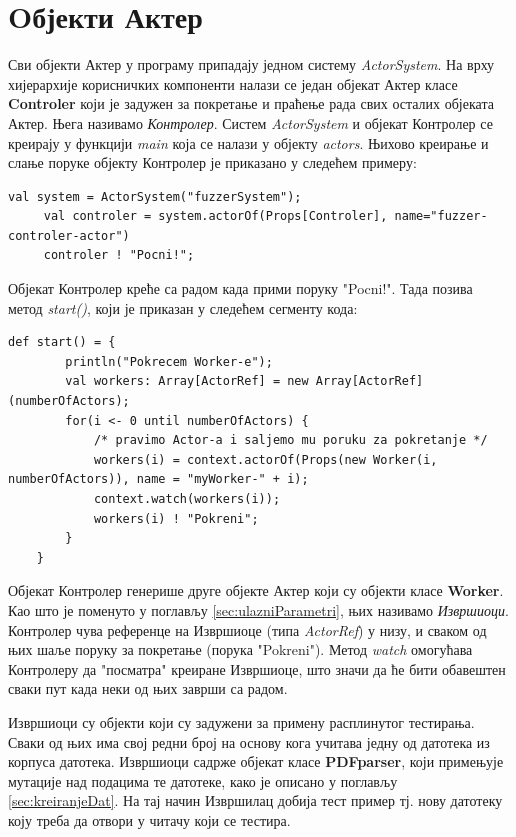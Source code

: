\documentclass[12pt,oneside]{memoir}
\begin{document}
\section{Oбјекти Актер}
\label{sec:actorObj}

Сви објекти Актер у програму припадају једном систему \textit{ActorSystem}. На врху хијерархије корисничких компоненти налази се један објекат Актер класе \textbf{Controler} који је задужен за покретање и праћење рада свих осталих објеката Актер. Њега називамо \textit{Контролер}. Систем \textit{ActorSystem} и објекат Контролер се креирају у функцији \textit{main} која се налази у објекту \textit{actors}. Њихово креирање и слање поруке објекту Контролер је приказано у следећем примеру:

\begin{lstlisting}[frame=single]
     val system = ActorSystem("fuzzerSystem");
     val controler = system.actorOf(Props[Controler], name="fuzzer-controler-actor")
     controler ! "Pocni!";
\end{lstlisting}

Објекат Контролер креће са радом када прими поруку "Pocni!". Тада позива метод \textit{start()}, који је приказан у следећем сегменту кода:

\begin{lstlisting}[frame=single]
    def start() = {
        println("Pokrecem Worker-e");
        val workers: Array[ActorRef] = new Array[ActorRef](numberOfActors);
        for(i <- 0 until numberOfActors) {
            /* pravimo Actor-a i saljemo mu poruku za pokretanje */
            workers(i) = context.actorOf(Props(new Worker(i, numberOfActors)), name = "myWorker-" + i);
            context.watch(workers(i));
            workers(i) ! "Pokreni";
        }
    }
\end{lstlisting}

Објекат Контролер генерише друге објекте Актер који су објекти класе \textbf{Worker}. Као што је поменуто у поглављу \ref{sec:ulazniParametri}, њих називамо \textit{Извршиоци}. Контролер чува референце на Извршиоце (типа \textit{ActorRef}) у низу, и сваком од њих шаље поруку за покретање (порука "Pokreni"). Метод \textit{watch} омогућава Контролеру да "посматра" креиране Извршиоце, што значи да ће бити обавештен сваки пут када неки од њих заврши са радом.

Извршиоци су објекти који су задужени за примену расплинутог тестирања. Сваки од њих има свој редни број на основу кога учитава једну од датотека из корпуса датотека. Извршиоци садрже објекат класе \textbf{PDFparser}, који примењује мутације над подацима те датотеке, како је описано у поглављу \ref{sec:kreiranjeDat}. На тај начин Извршилац добија тест пример тј. нову датотеку коју треба да отвори у читачу који се тестира.
 
\end{document}
